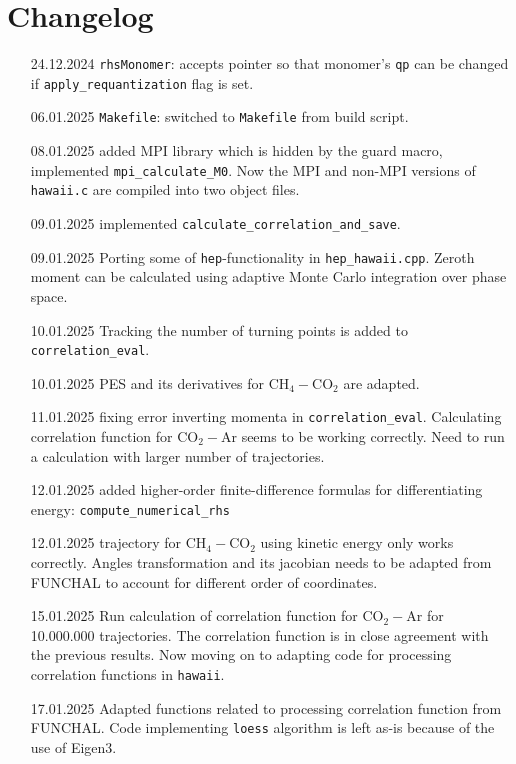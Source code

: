 \documentclass[color]{article}
\begin{document}
\printbibliography[heading=bibintoc]



\section{Changelog}
\label{sec:changelog}

\begin{enumerate}
    \item [24.12.2024] \texttt{rhsMonomer}: accepts pointer so that monomer's \texttt{qp} can be changed if \texttt{apply\_requantization} flag is set.
    \item [06.01.2025] \texttt{Makefile}: switched to \texttt{Makefile} from build script.
    \item [08.01.2025] added MPI library which is hidden by the guard macro, implemented \texttt{mpi\_calculate\_M0}. Now the MPI and non-MPI versions of \texttt{hawaii.c} are compiled into two object files.  
    \item [09.01.2025] implemented \texttt{calculate\_correlation\_and\_save}. 
    \item [09.01.2025] Porting some of \texttt{hep}-functionality in \texttt{hep\_hawaii.cpp}. Zeroth moment can be calculated using adaptive Monte Carlo integration over phase space.
    \item [10.01.2025] Tracking the number of turning points is added to \texttt{correlation\_eval}.
    \item [10.01.2025] PES and its derivatives for CH$_4-$CO$_2$ are adapted.
    \item [11.01.2025] fixing error inverting momenta in \texttt{correlation\_eval}. Calculating correlation function for CO$_2-$Ar seems to be working correctly. Need to run a calculation with larger number of trajectories.
    \item [12.01.2025] added higher-order finite-difference formulas for differentiating energy: \texttt{compute\_numerical\_rhs} 
    \item [12.01.2025] trajectory for CH$_4-$CO$_2$ using kinetic energy only works correctly. Angles transformation and its jacobian needs to be adapted from FUNCHAL to account for different order of coordinates.
    \item [15.01.2025] Run calculation of correlation function for CO$_2-$Ar for 10.000.000 trajectories. The correlation function is in close agreement with the previous results. Now moving on to adapting code for processing correlation functions in \texttt{hawaii}.
    \item [17.01.2025] Adapted functions related to processing correlation function from FUNCHAL. Code implementing \texttt{loess} algorithm is left as-is because of the use of Eigen3.

\end{enumerate}
\end{document}
